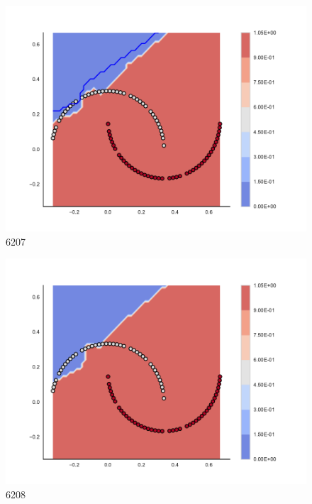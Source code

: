 \begin{subfigure}[b]{0.09\textwidth}
    \includegraphics[clip, trim=2.35cm 1.75cm 4.5cm 0cm,width=\textwidth]{img/convergence/6207.pdf}
    \caption{6207}
    \label{fig:convergence_6207}
\end{subfigure}
%
\begin{subfigure}[b]{0.09\textwidth}
    \includegraphics[clip, trim=2.35cm 1.75cm 4.5cm 0cm,width=\textwidth]{img/convergence/6208.pdf}
    \caption{6208}
    \label{fig:convergence_6208}
\end{subfigure}
%
